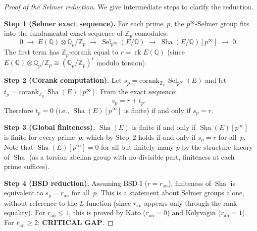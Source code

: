 \documentclass[11pt]{article}
\DeclareMathOperator{\rk}{rk}
\DeclareMathOperator{\Sha}{Sha}
\DeclareMathOperator{\Sel}{Sel}
\begin{document}
\begin{proof}[Proof of the Selmer reduction]
We give intermediate steps to clarify the reduction.

\textbf{Step 1 (Selmer exact sequence).}  For each prime~$p$, the
$p^\infty$-Selmer group fits into the fundamental exact sequence of
$\mathbb{Z}_p$-comodules:
\[
  0 \;\longrightarrow\; E(\mathbb{Q}) \otimes \mathbb{Q}_p/\mathbb{Z}_p
  \;\longrightarrow\; \Sel_{p^\infty}(E/\mathbb{Q})
  \;\longrightarrow\; \Sha(E/\mathbb{Q})[p^\infty]
  \;\longrightarrow\; 0.
\]
The first term has $\mathbb{Z}_p$-corank equal to $r = \rk E(\mathbb{Q})$
(since $E(\mathbb{Q}) \otimes \mathbb{Q}_p/\mathbb{Z}_p \cong
(\mathbb{Q}_p/\mathbb{Z}_p)^r$ modulo torsion).

\textbf{Step 2 (Corank computation).}  Let $s_p =
\mathrm{corank}_{\mathbb{Z}_p}\, \Sel_{p^\infty}(E)$ and let $t_p =
\mathrm{corank}_{\mathbb{Z}_p}\, \Sha(E)[p^\infty]$.  From the exact
sequence:
\[
  s_p = r + t_p.
\]
Therefore $t_p = 0$ (i.e., $\Sha(E)[p^\infty]$ is finite) if and only if
$s_p = r$.

\textbf{Step 3 (Global finiteness).}  $\Sha(E)$ is finite if and only if
$\Sha(E)[p^\infty]$ is finite for every prime~$p$, which by Step~2 holds if
and only if $s_p = r$ for all~$p$.  Note that $\Sha(E)[p^\infty] = 0$ for
all but finitely many $p$ by the structure theory of $\Sha$ (as a torsion
abelian group with no divisible part, finiteness at each prime suffices).

\textbf{Step 4 (BSD reduction).}  Assuming BSD-I ($r = r_{\mathrm{an}}$),
finiteness of $\Sha$ is equivalent to $s_p = r_{\mathrm{an}}$ for all~$p$.
This is a statement about Selmer groups alone, without reference to the
$L$-function (since $r_{\mathrm{an}}$ appears only through the rank
equality).  For $r_{\mathrm{an}} \leq 1$, this is proved by
Kato ($r_{\mathrm{an}} = 0$) and Kolyvagin ($r_{\mathrm{an}} = 1$).  For
$r_{\mathrm{an}} \geq 2$: \textbf{CRITICAL GAP}.
\end{proof}
\end{document}
